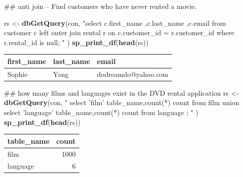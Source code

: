 \documentclass[]{book}
\newenvironment{Shaded}{\begin{snugshade}}{\end{snugshade}}
\newcommand{\KeywordTok}[1]{\textcolor[rgb]{0.13,0.29,0.53}{\textbf{#1}}}
\newcommand{\NormalTok}[1]{#1}
\newcommand{\StringTok}[1]{\textcolor[rgb]{0.31,0.60,0.02}{#1}}
\theoremstyle{definition}
\theoremstyle{definition}
\theoremstyle{definition}
\theoremstyle{remark}
\begin{document}
\begin{Shaded}
\begin{Highlighting}[]
\NormalTok{## anti join -- Find customers who have never rented a movie.}

\NormalTok{rs <-}\StringTok{ }\KeywordTok{dbGetQuery}\NormalTok{(con,}
                 \StringTok{"select c.first_name}
\StringTok{                        ,c.last_name}
\StringTok{                        ,c.email}
\StringTok{                    from customer c }
\StringTok{                         left outer join rental r}
\StringTok{                              on c.customer_id = r.customer_id }
\StringTok{                   where r.rental_id is null;}
\StringTok{                 "}
\NormalTok{                 )}
\KeywordTok{sp_print_df}\NormalTok{(}\KeywordTok{head}\NormalTok{(rs))}
\end{Highlighting}
\end{Shaded}

\begin{tabular}{l|l|l}
\hline
first\_name & last\_name & email\\
\hline
Sophie & Yang & dodreamdo@yahoo.com\\
\hline
\end{tabular}

\begin{Shaded}
\begin{Highlighting}[]
\NormalTok{## how many films and languages exist in the DVD rental application}
\NormalTok{rs <-}\StringTok{ }\KeywordTok{dbGetQuery}\NormalTok{(con,}
                \StringTok{"      select 'film' table_name,count(*) count from film }
\StringTok{                 union select 'language' table_name,count(*) count from language }
\StringTok{               ;}
\StringTok{                "}
\NormalTok{                )}
\KeywordTok{sp_print_df}\NormalTok{(}\KeywordTok{head}\NormalTok{(rs))}
\end{Highlighting}
\end{Shaded}

\begin{tabular}{l|r}
\hline
table\_name & count\\
\hline
film & 1000\\
\hline
language & 6\\
\hline
\end{tabular}
\end{document}
